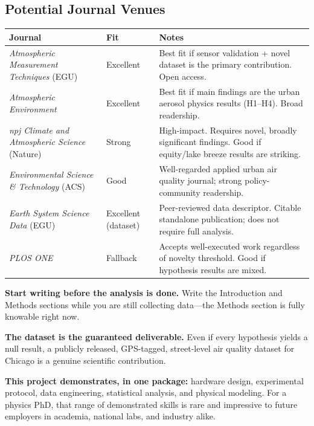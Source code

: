 \documentclass[11pt, letterpaper]{article}
\begin{document}
\subsection{Potential Journal Venues}

\medskip
\begin{center}
\begin{tabular}{L{4.2cm} C{1.8cm} L{7.2cm}}
\toprule
{}
\color{white}\textbf{Journal} &
\color{white}\textbf{Fit} &
\color{white}\textbf{Notes} \\
\midrule
\textit{Atmospheric Measurement Techniques} (EGU) &
Excellent &
Best fit if sensor validation + novel dataset is the primary contribution. Open access. \\
\textit{Atmospheric Environment} &
Excellent &
Best fit if main findings are the urban aerosol physics results (H1--H4). Broad readership. \\
\textit{npj Climate and Atmospheric Science} (Nature) &
Strong &
High-impact. Requires novel, broadly significant findings. Good if equity/lake breeze results are striking. \\
\textit{Environmental Science \& Technology} (ACS) &
Good &
Well-regarded applied urban air quality journal; strong policy-community readership. \\
\textit{Earth System Science Data} (EGU) &
Excellent (dataset) &
Peer-reviewed data descriptor. Citable standalone publication; does not require full analysis. \\
\textit{PLOS ONE} &
Fallback &
Accepts well-executed work regardless of novelty threshold. Good if hypothesis results are mixed. \\
\bottomrule
\end{tabular}
\end{center}

\begin{tcolorbox}[callout, title={Final Advice}]
\textbf{Start writing before the analysis is done.} Write the Introduction and Methods sections while you are still collecting data---the Methods section is fully knowable right now.

\medskip
\textbf{The dataset is the guaranteed deliverable.} Even if every hypothesis yields a null result, a publicly released, GPS-tagged, street-level air quality dataset for Chicago is a genuine scientific contribution.

\medskip
\textbf{This project demonstrates, in one package:} hardware design, experimental protocol, data engineering, statistical analysis, and physical modeling. For a physics PhD, that range of demonstrated skills is rare and impressive to future employers in academia, national labs, and industry alike.
\end{tcolorbox}

\end{document}
